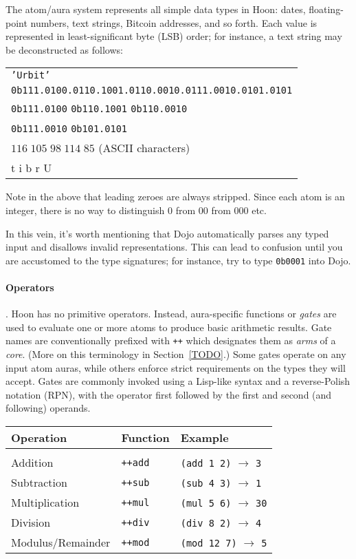 The atom/aura system represents all simple data types in Hoon:  dates, floating-point numbers, text strings, Bitcoin addresses, and so forth.  Each value is represented in least-significant byte (LSB) order; for instance, a text string may be deconstructed as follows:

\begin{tabular}{l}
  \texttt{'Urbit'} \\
  \texttt{0b111.0100.0110.1001.0110.0010.0111.0010.0101.0101} \\
  \texttt{0b111.0100} \texttt{0b110.1001} \texttt{0b110.0010} \\ \texttt{0b111.0010} \texttt{0b101.0101} \\
  $116\;105\;98\;114\;85$ (ASCII characters) \\
  t i b r U
\end{tabular}

Note in the above that leading zeroes are always stripped.  Since each atom is an integer, there is no way to distinguish $0$ from $00$ from $000$ etc.

In this vein, it's worth mentioning that Dojo automatically parses any typed input and disallows invalid representations.  This can lead to confusion until you are accustomed to the type signatures; for instance, try to type \texttt{0b0001} into Dojo.

\paragraph{Operators}.  Hoon has no primitive operators.  Instead, aura-specific functions or \emph{gates} are used to evaluate one or more atoms to produce basic arithmetic results.  Gate names are conventionally prefixed with \texttt{++} which designates them as \emph{arms} of a \emph{core}.  (More on this terminology in Section~\ref{TODO}.)  Some gates operate on any input atom auras, while others enforce strict requirements on the types they will accept.  Gates are commonly invoked using a Lisp-like syntax and a reverse-Polish notation (RPN), with the operator first followed by the first and second (and following) operands.

\begin{tabular}{lll}
  Operation & Function & Example \\ \hline \\
  Addition & \texttt{++add} & \texttt{(add 1 2)} $\rightarrow$ \texttt{3} \\
  Subtraction & \texttt{++sub} & \texttt{(sub 4 3)} $\rightarrow$ \texttt{1} \\
  Multiplication & \texttt{++mul} & \texttt{(mul 5 6)} $\rightarrow$ \texttt{30} \\
  Division & \texttt{++div} & \texttt{(div 8 2)} $\rightarrow$ \texttt{4} \\
  Modulus/Remainder & \texttt{++mod} & \texttt{(mod 12 7)} $\rightarrow$ \texttt{5} \\
\end{tabular}

